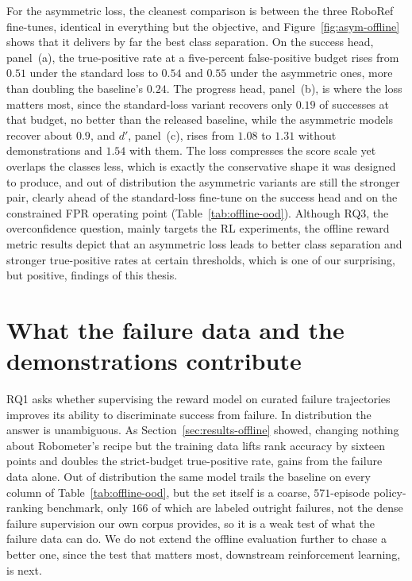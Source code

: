 For the asymmetric loss, the cleanest comparison is between the three RoboRef fine-tunes, identical in everything but the objective, and Figure~\ref{fig:asym-offline} shows that it delivers by far the best class separation. On the success head, panel~(a), the true-positive rate at a five-percent false-positive budget rises from $0.51$ under the standard loss to $0.54$ and $0.55$ under the asymmetric ones, more than doubling the baseline's $0.24$. The progress head, panel~(b), is where the loss matters most, since the standard-loss variant recovers only $0.19$ of successes at that budget, no better than the released baseline, while the asymmetric models recover about $0.9$, and $d'$, panel~(c), rises from $1.08$ to $1.31$ without demonstrations and $1.54$ with them. The loss compresses the score scale yet overlaps the classes less, which is exactly the conservative shape it was designed to produce, and out of distribution the asymmetric variants are still the stronger pair, clearly ahead of the standard-loss fine-tune on the success head and on the constrained FPR operating point (Table~\ref{tab:offline-ood}). Although RQ3, the overconfidence question, mainly targets the RL experiments, the offline reward metric results depict that an asymmetric loss leads to better class separation and stronger true-positive rates at certain thresholds, which is one of our surprising, but positive, findings of this thesis.


\section{What the failure data and the demonstrations contribute}
\label{sec:results-icl}

RQ1 asks whether supervising the reward model on curated failure trajectories improves its ability to discriminate success from failure. In distribution the answer is unambiguous. As Section~\ref{sec:results-offline} showed, changing nothing about Robometer's recipe but the training data lifts rank accuracy by sixteen points and doubles the strict-budget true-positive rate, gains from the failure data alone. Out of distribution the same model trails the baseline on every column of Table~\ref{tab:offline-ood}, but the set itself is a coarse, $571$-episode policy-ranking benchmark, only $166$ of which are labeled outright failures, not the dense failure supervision our own corpus provides, so it is a weak test of what the failure data can do. We do not extend the offline evaluation further to chase a better one, since the test that matters most, downstream reinforcement learning, is next.

